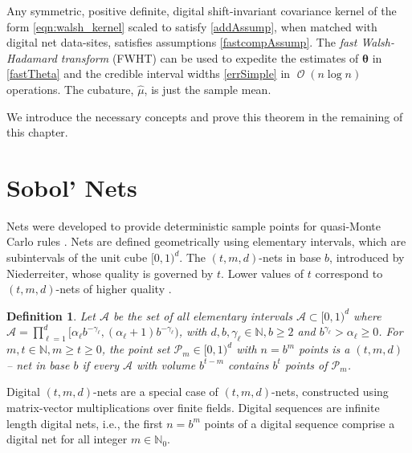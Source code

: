 \documentclass{svjour3}                     %
\DeclareMathOperator{\Order}{{\mathcal O}}
\newtheorem{defn}{Definition}
\newcommand{\bm}[1]{\boldsymbol{#1}}
\newcommand{\naturals}{\mathbb{N}}
\newcommand{\vtheta}{{\bm{\theta}}}
\newcommand{\hmu}{\widehat{\mu}}
\newcommand{\JRNote}[1]{{\textcolor{green}{JR: #1}}}
\begin{document}


\begin{theorem}
	Any symmetric, positive definite, digital shift-invariant covariance kernel of the form \eqref{eqn:walsh_kernel} scaled to satisfy \eqref{addAssump}, when matched with digital net data-sites, satisfies assumptions \eqref{fastcompAssump}.  The \emph{fast Walsh-Hadamard transform} (FWHT) can be used to expedite the estimates of $\vtheta$ in \eqref{fastTheta} and the credible interval widths \eqref{errSimple} in $\Order(n \log n)$ operations. The cubature, $\hmu$, is just the sample mean.
\end{theorem}
We introduce the necessary concepts and prove this theorem in the remaining of this chapter.

\section{Sobol' Nets}


Nets were developed to provide deterministic sample points for quasi-Monte Carlo rules \cite{Nie05a}. Nets are defined geometrically using elementary intervals, which are subintervals of the unit cube $[0,1)^d$.
The $(t,m, d)$-nets in base $b$, introduced by Niederreiter, 
whose quality is governed by $t$. Lower values of $t$ correspond to $(t,m, d)$-nets of higher quality \cite{Bald10a}.

\begin{defn}
	\label{defn:tmd_net}
	Let $\mathcal{A}$ be the set of all elementary intervals $\mathcal{A} \subset [0, 1)^d$ where
	$\mathcal{A} = \prod_{\ell=1}^d [\alpha_\ell b^{-\gamma_\ell} , (\alpha_\ell + 1) b^{-\gamma_\ell})$, 
	with $d,b,\gamma_\ell \in \naturals, b \ge 2$ 
	and $b^{\gamma_\ell}
	> \alpha_\ell \ge 0$. For $m,t \in \naturals, m \ge t \ge 0$, the point set $\mathcal{P}_m \in [0, 1)^d$ with $n = b^m$ points is a $(t, m, d)$ -- net in base $b$ if every $\mathcal{A}$ with volume $b^{t-m}$ contains $b^t$ points of $\mathcal{P}_m$.
\end{defn}

Digital $(t,m, d)$-nets are a special case of $(t,m, d)$-nets, constructed using matrix-vector multiplications over finite fields. Digital sequences are infinite length digital nets, i.e., the first $n=b^m$ points of a digital sequence comprise a digital net for all integer $m \in \naturals_0$.
\end{document}
